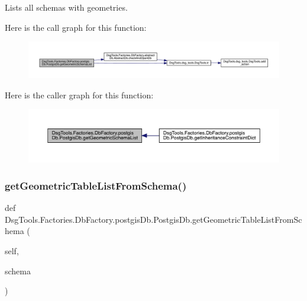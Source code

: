 \begin{DoxyVerb}Lists all schemas with geometries.
\end{DoxyVerb}
 Here is the call graph for this function\+:
\nopagebreak
\begin{figure}[H]
\begin{center}
\leavevmode
\includegraphics[width=350pt]{class_dsg_tools_1_1_factories_1_1_db_factory_1_1postgis_db_1_1_postgis_db_a0a3bf0c6d621b4852b7f3d5ff47b2245_cgraph}
\end{center}
\end{figure}
Here is the caller graph for this function\+:
\nopagebreak
\begin{figure}[H]
\begin{center}
\leavevmode
\includegraphics[width=350pt]{class_dsg_tools_1_1_factories_1_1_db_factory_1_1postgis_db_1_1_postgis_db_a0a3bf0c6d621b4852b7f3d5ff47b2245_icgraph}
\end{center}
\end{figure}
\mbox{\label{class_dsg_tools_1_1_factories_1_1_db_factory_1_1postgis_db_1_1_postgis_db_a9fbbc8c65725c8ea6cd7cf2783ba20a4}} 
\subsubsection{\texorpdfstring{get\+Geometric\+Table\+List\+From\+Schema()}{getGeometricTableListFromSchema()}}
{\footnotesize\ttfamily def Dsg\+Tools.\+Factories.\+Db\+Factory.\+postgis\+Db.\+Postgis\+Db.\+get\+Geometric\+Table\+List\+From\+Schema (\begin{DoxyParamCaption}\item[{}]{self,  }\item[{}]{schema }\end{DoxyParamCaption})}

